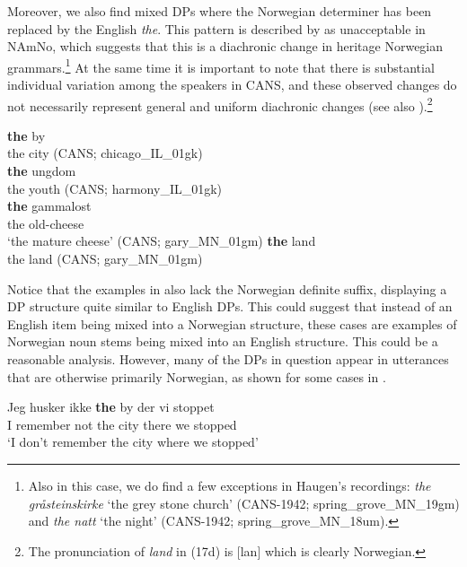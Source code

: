 \documentclass[output=paper]{langscibook}
\begin{document}
Moreover, we also find mixed DPs where the Norwegian determiner has been replaced by the English \textit{the}. This pattern is described by \citet[451]{Haugen1953} as unacceptable in NAmNo, which suggests that this is a diachronic change in heritage Norwegian grammars.\footnote{ \textrm{Also in this case, we do find a few exceptions in Haugen’s recordings:} \textrm{\textit{the gråsteinskirke} }\textrm{‘the grey stone church’ (CANS-1942; spring\_grove\_MN\_19gm) and} \textrm{\textit{the natt}} \textrm{‘the night’ (CANS-1942; spring\_grove\_MN\_18um).}} At the same time it is important to note that there is substantial individual variation among the speakers in CANS, and these observed changes do not necessarily represent general and uniform diachronic changes (see also \citealt{AnderssenEtAl2018}).\footnote{\textrm{The pronunciation of \emph{land} in (17d) is [lan] which is clearly Norwegian.} } 


\ea\label{ex:riksem:26}
\ea \label{ex:riksem:26a}
\gll \textbf{the} by\\
	 the city (CANS; %
     chicago\_IL\_01gk)\\
\ex \label{ex:riksem:26b}
\gll \textbf{the} ungdom\\
	 the youth (CANS; harmony\_IL\_01gk)\\
\ex \label{ex:riksem:26c}
\gll \textbf{the} gammalost\\
	 the old-cheese\\
\glt ‘the mature cheese’ (CANS; %
gary\_MN\_01gm)
\ex \label{ex:riksem:26d}
\gll \textbf{the} land\\
	 the land (CANS; %
     gary\_MN\_01gm)\\
\z
\z

Notice that the examples in  also lack the Norwegian definite suffix, displaying a DP structure quite similar to English DPs. This could suggest that instead of an English item being mixed into a Norwegian structure, these cases are examples of Norwegian noun stems being mixed into an English structure. This could be a reasonable analysis. However, many of the DPs in question appear in utterances that are otherwise primarily Norwegian, as shown for some cases in . 


\ea\label{ex:riksem:27}
\ea
\gll Jeg husker ikke \textbf{the} by der vi stoppet\\
	 I remember not the city there we stopped\\
\glt ‘I don’t remember the city where we stopped’
\end{document}
